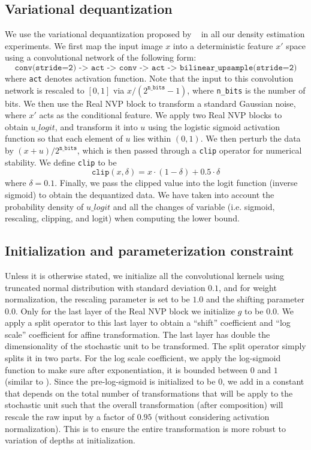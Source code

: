 \documentclass{article}
\begin{document}
\subsection{Variational dequantization}
We use the variational dequantization proposed by ~\citet{ho2019flow++} in all our density estimation experiments. 
We first map the input image $x$ into a deterministic feature $x'$ space using a convolutional network of the following form: 
$$\texttt{conv(stride=2) -> act -> conv -> act -> bilinear\_upsample(stride=2)}$$
where \texttt{act} denotes activation function. 
Note that the input to this convolution network is rescaled to $[0,1]$ via $x/(2^\texttt{n\_bits}-1)$, where \texttt{n\_bits} is the number of bits.
We then use the Real NVP block to transform a standard Gaussian noise, where $x'$ acts as the conditional feature. 
We apply two Real NVP blocks to obtain $u\_logit$, and transform it into $u$ using the logistic sigmoid activation function so that each element of $u$ lies within $(0,1)$.
We then perturb the data by $(x+u)/2^{\texttt{n\_bits}}$, which is then passed through a \texttt{clip} operator for numerical stability. 
We define \texttt{clip} to be 
$$\texttt{clip}(x, \delta) = x\cdot(1-\delta) + 0.5\cdot\delta$$
where $\delta=0.1$. 
Finally, we pass the clipped value into the logit function (inverse sigmoid) to obtain the dequantized data. 
We have taken into account the probability density of $u\_logit$ and all the changes of variable (i.e. sigmoid, rescaling, clipping, and logit) when computing the lower bound.

\subsection{Initialization and parameterization constraint}
\label{app:init}
Unless it is otherwise stated, we initialize all the convolutional kernels using truncated normal distribution with standard deviation $0.1$, and for weight normalization, the rescaling parameter is set to be $1.0$ and the shifting parameter $0.0$. 
Only for the last layer of the Real NVP block we initialize $g$ to be $0.0$. 
We apply a split operator to this last layer to obtain a ``shift'' coefficient and ``log scale'' coefficient for affine transformation. 
The last layer has double the dimensionality of the stochastic unit to be transformed.
The split operator simply splits it in two parts. 
For the log scale coefficient, we apply the log-sigmoid function to make sure after exponentiation, it is bounded between $0$ and $1$ (similar to \citet{kingma2018glow}). 
Since the pre-log-sigmoid is initialized to be $0$, we add in a constant that depends on the total number of transformations that will be apply to the stochastic unit such that the overall transformation (after composition) will rescale the raw input by a factor of $0.95$ (without considering activation normalization). 
This is to ensure the entire transformation is more robust to variation of depths at initialization. 
\end{document}
